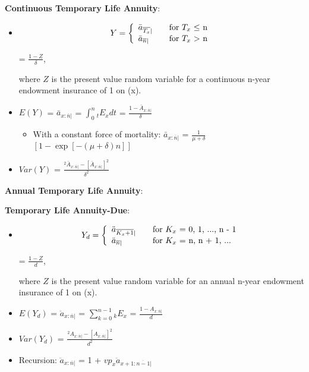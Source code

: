 \documentclass[]{book}
\providecommand{\tightlist}{%
  \setlength{\itemsep}{0pt}\setlength{\parskip}{0pt}}
\begin{document}
\textbf{Continuous Temporary Life Annuity}:

\begin{itemize}
\item
  \[Y = \left\{
    \begin{array}{l l}
      \bar{a}_{\overline{T_x}|}   & \quad \text{for $T_x$ $\le$ n}\\
      \bar{a}_{\overline{n}|}        & \quad \text{for $T_x$ $>$ n}\\
    \end{array} \right.\]

  = \(\frac{1 - Z}{\delta}\),

  where \(Z\) is the present value random variable for a continuous
  n-year endowment insurance of 1 on (x).
\item
  \(E(Y)\) = \(\bar{a}_{x:\overline{n}|}\) =
  \(\int^{n}_{0} {}_{t}E_xdt\) =
  \(\frac{1 - \bar{A}_{x:\overline{n}|}}{\delta}\)

  \begin{itemize}
  \tightlist
  \item
    With a constant force of mortality: \(\bar{a}_{x:\overline{n}|}\) =
    \(\frac{1}{\mu + \delta}\)\([1 - \exp[-(\mu + \delta)n]]\)
  \end{itemize}
\item
  \(Var(Y)\) =
  \(\frac{^2\bar{A}_{x:\overline{n}|} - [\bar{A}_{x:\overline{n}|}]^2}{\delta^2}\)
\end{itemize}

\textbf{Annual Temporary Life Annuity}:

\textbf{Temporary Life Annuity-Due}:

\begin{itemize}
\item
  \[Y_d = \left\{
    \begin{array}{l l}
      \ddot{a}_{\overline{K_x + 1}|}   & \quad \text{for $K_x$ = 0, 1, ..., n - 1}\\
      \ddot{a}_{\overline{n}|}             & \quad \text{for $K_x$ = n, n + 1, ...}\\
    \end{array} \right.\]

  = \(\frac{1 - Z}{d}\),

  where \(Z\) is the present value random variable for an annual n-year
  endowment insurance of 1 on (x).
\item
  \(E(Y_d)\) = \(\ddot{a}_{x:\overline{n}|}\) =
  \(\sum^{n - 1}_{k = 0} {}_{k}E_x\) =
  \(\frac{1 - A_{x:\overline{n}|}}{d}\)
\item
  \(Var(Y_d)\) =
  \(\frac{^2 A_{x:\overline{n}|} - [A_{x:\overline{n}|}]^2}{d^2}\)
\item
  Recursion: \(\ddot{a}_{x:\overline{n}|}\) = 1 +
  \(vp_x\ddot{a}_{x + 1:\overline{n-1}|}\)
\end{itemize}
\end{document}

